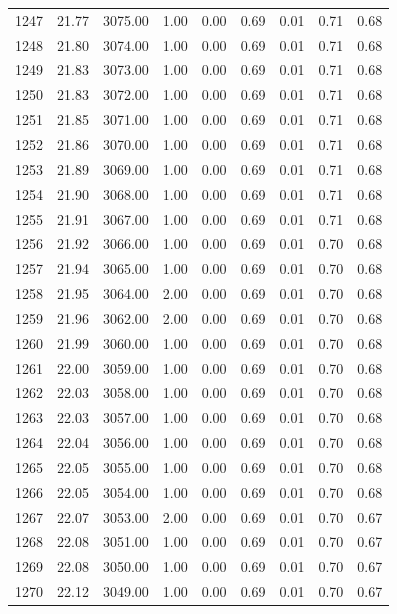\documentclass{article}\usepackage[]{graphicx}\usepackage[]{color}
\begin{document}
\begin{longtable}{rrrrrrrrr}
  1247 & 21.77 & 3075.00 & 1.00 & 0.00 & 0.69 & 0.01 & 0.71 & 0.68 \\ 
  1248 & 21.80 & 3074.00 & 1.00 & 0.00 & 0.69 & 0.01 & 0.71 & 0.68 \\ 
  1249 & 21.83 & 3073.00 & 1.00 & 0.00 & 0.69 & 0.01 & 0.71 & 0.68 \\ 
  1250 & 21.83 & 3072.00 & 1.00 & 0.00 & 0.69 & 0.01 & 0.71 & 0.68 \\ 
  1251 & 21.85 & 3071.00 & 1.00 & 0.00 & 0.69 & 0.01 & 0.71 & 0.68 \\ 
  1252 & 21.86 & 3070.00 & 1.00 & 0.00 & 0.69 & 0.01 & 0.71 & 0.68 \\ 
  1253 & 21.89 & 3069.00 & 1.00 & 0.00 & 0.69 & 0.01 & 0.71 & 0.68 \\ 
  1254 & 21.90 & 3068.00 & 1.00 & 0.00 & 0.69 & 0.01 & 0.71 & 0.68 \\ 
  1255 & 21.91 & 3067.00 & 1.00 & 0.00 & 0.69 & 0.01 & 0.71 & 0.68 \\ 
  1256 & 21.92 & 3066.00 & 1.00 & 0.00 & 0.69 & 0.01 & 0.70 & 0.68 \\ 
  1257 & 21.94 & 3065.00 & 1.00 & 0.00 & 0.69 & 0.01 & 0.70 & 0.68 \\ 
  1258 & 21.95 & 3064.00 & 2.00 & 0.00 & 0.69 & 0.01 & 0.70 & 0.68 \\ 
  1259 & 21.96 & 3062.00 & 2.00 & 0.00 & 0.69 & 0.01 & 0.70 & 0.68 \\ 
  1260 & 21.99 & 3060.00 & 1.00 & 0.00 & 0.69 & 0.01 & 0.70 & 0.68 \\ 
  1261 & 22.00 & 3059.00 & 1.00 & 0.00 & 0.69 & 0.01 & 0.70 & 0.68 \\ 
  1262 & 22.03 & 3058.00 & 1.00 & 0.00 & 0.69 & 0.01 & 0.70 & 0.68 \\ 
  1263 & 22.03 & 3057.00 & 1.00 & 0.00 & 0.69 & 0.01 & 0.70 & 0.68 \\ 
  1264 & 22.04 & 3056.00 & 1.00 & 0.00 & 0.69 & 0.01 & 0.70 & 0.68 \\ 
  1265 & 22.05 & 3055.00 & 1.00 & 0.00 & 0.69 & 0.01 & 0.70 & 0.68 \\ 
  1266 & 22.05 & 3054.00 & 1.00 & 0.00 & 0.69 & 0.01 & 0.70 & 0.68 \\ 
  1267 & 22.07 & 3053.00 & 2.00 & 0.00 & 0.69 & 0.01 & 0.70 & 0.67 \\ 
  1268 & 22.08 & 3051.00 & 1.00 & 0.00 & 0.69 & 0.01 & 0.70 & 0.67 \\ 
  1269 & 22.08 & 3050.00 & 1.00 & 0.00 & 0.69 & 0.01 & 0.70 & 0.67 \\ 
  1270 & 22.12 & 3049.00 & 1.00 & 0.00 & 0.69 & 0.01 & 0.70 & 0.67 \\ 

\end{longtable}
\end{document}
